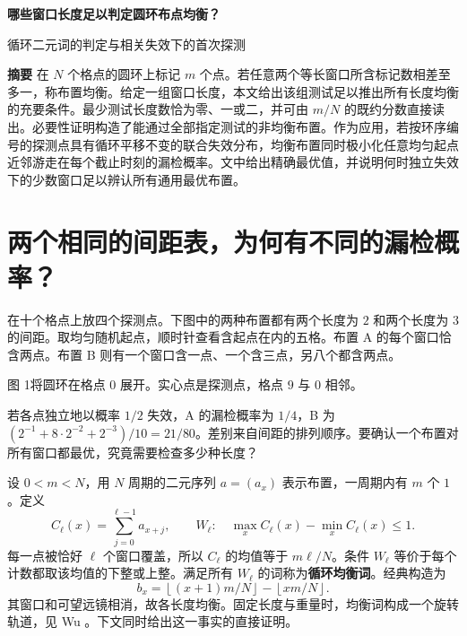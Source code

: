 \documentclass[UTF8,12pt,a4paper,fontset=fandol]{ctexart}
\theoremstyle{plaincn}
\newcommand{\fl}[1]{\left\lfloor #1\right\rfloor}
\begin{document}
\begin{center}
{\LARGE\bfseries 哪些窗口长度足以判定圆环布点均衡？\par}
\vspace{.4em}
{\large 循环二元词的判定与相关失效下的首次探测\par}
\end{center}

\noindent\textbf{摘要}\quad
在 $N$ 个格点的圆环上标记 $m$ 个点。若任意两个等长窗口所含标记数相差至多一，称布置均衡。给定一组窗口长度，本文给出该组测试足以推出所有长度均衡的充要条件。最少测试长度数恰为零、一或二，并可由 $m/N$ 的既约分数直接读出。必要性证明构造了能通过全部指定测试的非均衡布置。作为应用，若按环序编号的探测点具有循环平移不变的联合失效分布，均衡布置同时极小化任意均匀起点近邻游走在每个截止时刻的漏检概率。文中给出精确最优值，并说明何时独立失效下的少数窗口足以辨认所有通用最优布置。

\section{两个相同的间距表，为何有不同的漏检概率？}
在十个格点上放四个探测点。下图中的两种布置都有两个长度为 $2$ 和两个长度为 $3$ 的间距。取均匀随机起点，顺时针查看含起点在内的五格。布置 A 的每个窗口恰含两点。布置 B 则有一个窗口含一点、一个含三点，另八个都含两点。
\begin{center}

{\small 图 1\quad 将圆环在格点 $0$ 展开。实心点是探测点，格点 $9$ 与 $0$ 相邻。}
\end{center}
若各点独立地以概率 $1/2$ 失效，A 的漏检概率为 $1/4$，B 为
$(2^{-1}+8\cdot2^{-2}+2^{-3})/10=21/80$。差别来自间距的排列顺序。要确认一个布置对所有窗口都最优，究竟需要检查多少种长度？

设 $0<m<N$，用 $N$ 周期的二元序列 $a=(a_x)$ 表示布置，一周期内有 $m$ 个 $1$。定义
\[
 C_\ell(x)=\sum_{j=0}^{\ell-1}a_{x+j},\qquad
 W_\ell:\quad \max_x C_\ell(x)-\min_x C_\ell(x)\le1 .
\]
每一点被恰好 $\ell$ 个窗口覆盖，所以 $C_\ell$ 的均值等于 $m\ell/N$。条件 $W_\ell$ 等价于每个计数都取该均值的下整或上整。满足所有 $W_\ell$ 的词称为\textbf{循环均衡词}。经典构造为
\begin{equation}
 b_x=\fl{(x+1)m/N}-\fl{xm/N}.                          \label{eq:word}
\end{equation}
其窗口和可望远镜相消，故各长度均衡。固定长度与重量时，均衡词构成一个旋转轨道，见 Wu \cite{wu}。下文同时给出这一事实的直接证明。
\end{document}
